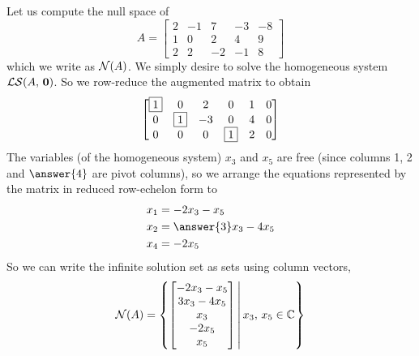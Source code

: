 \documentclass{ximera}
\begin{document}
\begin{example}
  Let us compute the null space of
  \[
    A=\begin{bmatrix}
      2 & -1 & 7 & -3 & -8 \\
      1 & 0 & 2 & 4 & 9 \\
      2 & 2 & -2 & -1 & 8
    \end{bmatrix}
  \]
  which we write as $\mathcal{N}\!\left(A\right)$.  We simply desire to solve the
  homogeneous system $\mathcal{LS}\!\left(A,\,\mathbf{0}\right)$.  So we row-reduce the augmented
  matrix to obtain
  \[
    \begin{bmatrix}
      \fbox{1} & 0 & 2 & 0 & 1 & 0 \\
      0 & \fbox{1} & -3 & 0 & 4 & 0 \\
      0 & 0 & 0 & \fbox{1} & 2 & 0
    \end{bmatrix}
  \]
  The variables (of the homogeneous system) $x_3$ and $x_5$ are free
  (since columns 1, 2 and $\answer{4}$ are pivot columns), so we arrange
  the equations represented by the matrix in reduced row-echelon form
  to
  \begin{align*}
    x_1&=-2x_3-x_5\\
    x_2&=\answer{3}x_3-4x_5\\
    x_4&=-2x_5\\
  \end{align*}
  So we can write the infinite solution set as sets using column vectors,
  \[
    \mathcal{N}\!\left(A\right)=\left\lbrace
      \begin{bmatrix}-2x_3-x_5\\3x_3-4x_5\\x_3\\-2x_5\\x_5\end{bmatrix}
    \,\middle|\,
      x_3,\,x_5\in\mathbb{C}
    \right\rbrace
  \]
\end{example}
\end{document}
